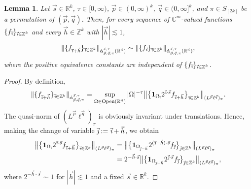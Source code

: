 \documentclass[11pt, reqno]{amsart}
\newtheorem{lemma}[theorem]{Lemma}
\theoremstyle{definition}
\theoremstyle{remark}
\numberwithin{equation}{section}
\newcommand{\C}{\mathbb C}
\newcommand{\R}{\mathbb R}
\newcommand{\Z}{\mathbb Z}
\newcommand{\vh}{\vec h}
\newcommand{\vi}{\vec{\textit{\i}}}
\newcommand{\vj}{\vec{\textit{\j}}}
\newcommand{\vn}{\vec n}
\newcommand{\vp}{\vec p}
\newcommand{\vq}{\vec q}
\newcommand{\vs}{\vec s}
\newcommand{\aatau}{\dot{\alpha}^{\vs,\tau}_{\vp,\vq,\pi}}
\newcommand{\one}{\mathbf{1}}
\newcommand{\abs}[1]{|#1|}
\newcommand{\Norm}[2]{\|#1\|_{#2}}
\newcommand{\bNorm}[2]{\big\|#1\big\|_{#2}}
\newcommand{\Open}{\mathrm{Open}}
\begin{document}
\begin{lemma}\label{shift}
Let $\vs\in\R^k$, $\tau\in[0,\infty)$, $\vp\in(0,\infty)^k$, $\vq\in(0,\infty]^k$,
and $\pi\in S_{[2k]}$ be a permutation of $(\vp,\vq)$.
Then, for every sequence of $\C^m$-valued functions $\{f_{\vi}\}_{\vi\in\Z^k}$
and every $\vh\in\Z^k$ with $\abs{\vh}\lesssim 1$,
\begin{equation*}
\Norm{\{f_{\vi+\vh}\}_{\vi\in\Z^k}}{\aatau(\R^{\vn})}
\sim\Norm{\{f_{\vi}\}_{\vi\in\Z^k}}{\aatau(\R^{\vn})},
\end{equation*}
where the positive equivalence constants are independent of $\{f_{\vi}\}_{\vi\in\Z^k}$.
\end{lemma}

\begin{proof}
By definition,
\begin{equation*}
\Norm{\{f_{\vi+\vh}\}_{\vi\in\Z^k}}{\aatau}
=\sup_{\Omega\in\Open(\R^{\vn})}\abs{\Omega}^{-\tau}\bNorm{\big\{\one_{\Omega_{\vi}}2^{\vi\cdot\vs}
f_{\vi+\vh}\big\}_{\vi\in\Z^k}}{(L^{\vp}\ell^{\vq})_\pi}.
\end{equation*}
The quasi-norm of $(L^{\vp}\ell^{\vq})_\pi$ is obviously invariant under translations. Hence, making the change of variable $\vj:=\vi+\vh$, we obtain
\begin{equation}\label{shift1}
\begin{split}
\bNorm{\big\{\one_{\Omega_{\vi}}2^{\vi\cdot\vs}f_{\vi+\vh}\big\}_{\vi\in\Z^k}}{(L^{\vp}\ell^{\vq})_\pi}
&=\bNorm{\big\{\one_{\Omega_{\vj-\vh}}2^{(\vj-\vh)\cdot\vs}f_{\vj}\big\}_{\vj\in\Z^k}}
{(L^{\vp}\ell^{\vq})_\pi} \\
&=2^{-\vh\cdot\vs}\bNorm{\big\{\one_{\Omega_{\vj-\vh}}2^{\vj\cdot\vs}f_{\vj}
\big\}_{\vj\in\Z^k}}{(L^{\vp}\ell^{\vq})_\pi},
\end{split}
\end{equation}
where $2^{-\vh\cdot\vs}\sim 1$ for $\abs{\vh}\lesssim 1$ and a fixed $\vs\in\R^k$.


\end{proof}
\end{document}
